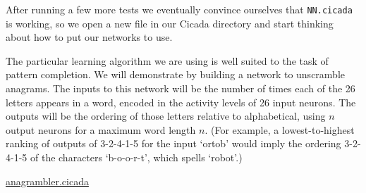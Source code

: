 \documentclass{article}
\begin{document}
After running a few more tests we eventually convince ourselves that \verb#NN.cicada# is working, so we open a new file in our Cicada directory and start thinking about how to put our networks to use.

The particular learning algorithm we are using is well suited to the task of pattern completion.  We will demonstrate by building a network to unscramble anagrams.  The inputs to this network will be the number of times each of the 26 letters appears in a word, encoded in the activity levels of 26 input neurons.  The outputs will be the ordering of those letters relative to alphabetical, using $n$ output neurons for a maximum word length $n$.  (For example, a lowest-to-highest ranking of outputs of 3-2-4-1-5 for the input `ortob' would imply the ordering 3-2-4-1-5 of the characters `b-o-o-r-t', which spells `robot'.)\\\vspace{.2in}

\noindent \underline{anagrambler.cicada}
\end{document}

